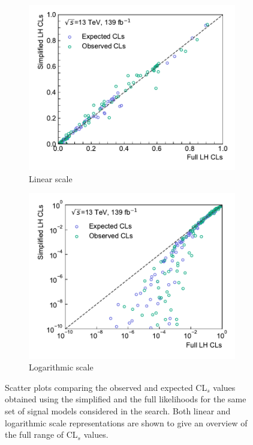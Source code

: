\begin{figure}
	\centering
	\begin{subfigure}[b]{0.5\textwidth}
		\centering\includegraphics[width=\textwidth]{cls_scatter_1Lbb_lin}
		\caption{Linear scale}
	\end{subfigure}\hfill
	\begin{subfigure}[b]{0.5\textwidth}
		\centering\includegraphics[width=\textwidth]{cls_scatter_1Lbb_log}
		\caption{Logarithmic scale}
	\end{subfigure}
	\caption{Scatter plots comparing the observed and expected CL$_s$ values obtained using the simplified and the full likelihoods for the same set of signal models considered in the \onelepton search. Both linear and logarithmic scale representations are shown to give an overview of the full range of CL$_s$ values.}\label{fig:scatter_cls}
\end{figure}



